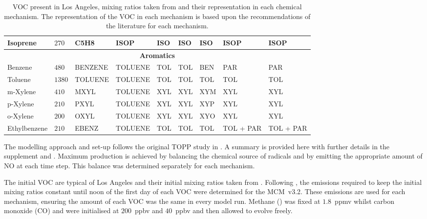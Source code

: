 \begin{sidewaystable}
\begin{tabular}{lllllllll}
        Isoprene & $270$ & C5H8 & ISOP & ISO & ISO & ISO & ISOP & ISOP \\ \hline
        \multicolumn{9}{c}{\textbf{Aromatics}} \\ \hline 
        Benzene & $480$ & BENZENE & TOLUENE & TOL & TOL & BEN & PAR & PAR \\
        Toluene & $1380$ & TOLUENE & TOLUENE & TOL & TOL & TOL & TOL & TOL \\
        m-Xylene & $410$ & MXYL & TOLUENE & XYL & XYL & XYM & XYL & XYL \\
        p-Xylene & $210$ & PXYL & TOLUENE & XYL & XYL & XYP & XYL & XYL \\
        o-Xylene & $200$ & OXYL & TOLUENE & XYL & XYL & XYO & XYL & XYL \\
        Ethylbenzene & $210$ & EBENZ & TOLUENE & TOL & TOL & TOL & TOL + PAR & TOL + PAR \\ \hline \hline
    \end{tabular}
    \vspace{1mm}
    \caption{VOC present in Los Angeles, mixing ratios taken from \citet{Baker:2008} and their representation in each chemical mechanism. The representation of the VOC in each mechanism is based upon the recommendations of the literature for each mechanism.}
    \vspace{-4mm}
    \label{t:initial_conditions}
\end{sidewaystable}

The modelling approach and set-up follows the original TOPP study in \citet{Butler:2011}.
A summary is provided here with further details in the supplement and \citet{Butler:2011}. 
Maximum  production is achieved by balancing the chemical source of radicals and  by emitting the appropriate amount of NO at each time step.
This balance was determined separately for each mechanism.

The initial VOC are typical of Los Angeles and their initial mixing ratios taken from \citet{Baker:2008}. 
Following \citet{Butler:2011}, the emissions required to keep the initial mixing ratios constant until noon of the first day of each VOC were determined for the \mbox{MCM v3.2.}
These emissions are used for each mechanism, ensuring the amount of each VOC was the same in every model run.
Methane () was fixed at \mbox{$1.8$ ppmv} whilst carbon monoxide (CO) and  were initialised at \mbox{$200$ ppbv} and \mbox{$40$ ppbv} and then allowed to evolve freely.

